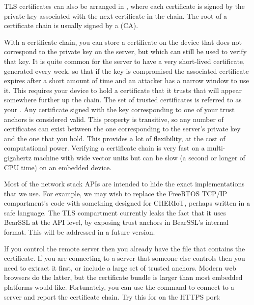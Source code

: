 TLS certificates can also be arranged in , where each certificate is signed by the private key associated with the next certificate in the chain.
The root of a certificate chain is usually signed by a  (CA).

With a certificate chain, you can store a certificate on the device that does not correspond to the private key on the server, but which can still be used to verify that key.
It is quite common for the server to have a very short-lived certificate, generated every week, so that if the key is compromised the associated certificate expires after a short amount of time and an attacker has a narrow window to use it.
This requires your device to hold a certificate that it trusts that will appear somewhere further up the chain.
The set of trusted certificates is referred to as your .
Any certificate signed with the key corresponding to one of your trust anchors is considered valid.
This property is transitive, so any number of certificates can exist between the one corresponding to the server's private key and the one that you hold.
This provides a lot of flexibility, at the cost of computational power.
Verifying a certificate chain is very fast on a multi-gigahertz machine with wide vector units but can be slow (a second or longer of CPU time) on an embedded device.

\begin{note}
Most of the network stack APIs are intended to hide the exact implementations that we use.
For example, we may wish to replace the FreeRTOS TCP/IP compartment's code with something designed for CHERIoT, perhaps written in a safe language.
The TLS compartment currently leaks the fact that it uses BearSSL at the API level, by exposing trust anchors in BearSSL's internal format.
This will be addressed in a future version.
\end{note}

If you control the remote server then you already have the  file that contains the certificate.
If you are connecting to a server that someone else controls then you need to extract it first, or include a large set of trusted anchors.
Modern web browsers do the latter, but the certificate bundle is larger than most embedded platforms would like.
Fortunately, you can use the  command to connect to a server and report the certificate chain.
Try this for  on the HTTPS port:

